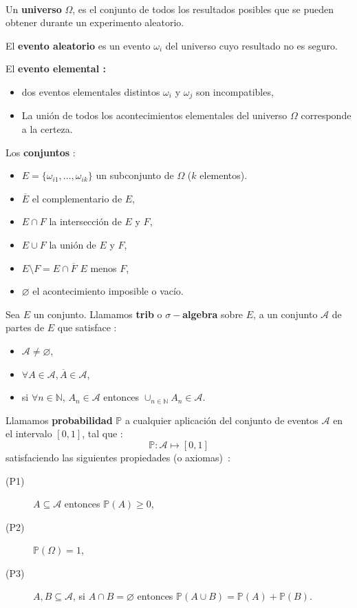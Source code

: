 
\begin{f}[Axiomas]{\ }
	
	Un \textbf{universo} \(\Omega\), es el conjunto de todos los resultados posibles que se pueden obtener durante un experimento aleatorio.
	
	El \textbf{evento aleatorio} es un evento \(\omega_i\) del universo cuyo resultado no es seguro.
	
	
	El \textbf{evento elemental :}
	\begin{itemize}
		\item dos eventos elementales distintos \(\omega_i\) y \(\omega_j\) son incompatibles,
		\item La unión de todos los acontecimientos elementales del universo \(\Omega \) corresponde a la certeza.
	\end{itemize}
	
	Los \textbf {conjuntos} :
	\begin{itemize}
		\item \(E=\lbrace \omega_{i1},\ldots , \omega_{ik}\rbrace\) un subconjunto de \(\Omega\) (\(k\) elementos).
		\item \(\overline{E}\) el complementario de \(E\),
		\item \(E\cap F\) la intersección de \(E\) y \(F\),
		\item \(E\cup F\) la unión de \(E\) y \(F\),
		\item \(E\setminus F= E\cap\overline{F}\) \(E\) menos \(F\),
		\item \(\varnothing\) el acontecimiento imposible o vacío.
	\end{itemize}
	
	Sea \(E\) un conjunto. Llamamos \textbf{trib} o \textbf{\(\sigma-\)algebra} sobre \(E\), a un conjunto \(\mathcal{A}\) de partes de \(E\) que satisface :
	\begin{itemize}
		\item     \(\mathcal{A} \not=\varnothing\),
		\item     \(\forall A \in \mathcal{A} , \overline{A} \in\mathcal{A}\),
		\item     si \(\forall n \in \mathbb{N}\), \(A_n \in\mathcal{A}\) entonces \(\cup_{n\in\mathbb{N} } A_n \in\mathcal{A}\).
	\end{itemize}
	
	Llamamos \textbf{probabilidad} \(\mathbb{P}\) a cualquier aplicación del conjunto de eventos \(\mathcal{A}\) en el intervalo \([0,1]\), tal que :      \[\mathbb{P} :      \mathcal{A}  \mapsto   [0,1]\]
	satisfaciendo las siguientes propiedades (o axiomas)~:
	\begin{description}
		\item[(P1)] \(A \subseteq \mathcal{A} \)    entonces  \( \mathbb{P}(A) \geq 0\),
		\item[(P2)] \( \mathbb{P}(\Omega) = 1\),
		\item[(P3)] \(A, B \subseteq \mathcal{A}\),  si  \(A\cap B =\varnothing\)    entonces   \(\mathbb{P}(A\cup B)=\mathbb{P}(A) + \mathbb{P}(B)\).
	\end{description}
	

\end{f}
